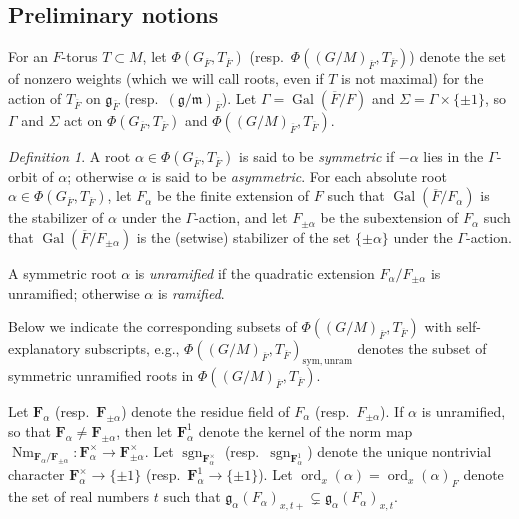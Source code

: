 \documentclass[reqno]{amsart}
\numberwithin{equation}{subsection}
\newcommand{\F}{\mathbf{F}}
\newcommand{\sgn}{\operatorname{sgn}}
\newcommand{\Gal}{\operatorname{Gal}}
\newcommand{\ol}[1]{\overline{#1}}
\newcommand{\co}{\colon}
\DeclareMathOperator{\ord}{ord}
\DeclareMathOperator{\Nm}{Nm}
\theoremstyle{remark}
\newtheorem{defn}[thm]{Definition}
\numberwithin{equation}{subsection}
\numberwithin{figure}{subsection}
\begin{document}
\subsection{Preliminary notions}\label{ssec:FKS-preliminaries}
For an $F$-torus $T \subset M$, let $\Phi(G_{\ol F}, T_{\ol F})$ (resp.\ $\Phi((G/M)_{\ol F}, T_{\ol F})$) denote the set of nonzero weights (which we will call roots, even if $T$ is not maximal) for the action of $T_{\ol F}$ on $\mathfrak{g}_{\ol F}$ (resp.\ $(\mathfrak{g}/\mathfrak{m})_{\ol F}$). Let $\Gamma = \Gal(\ol F/F)$ and $\Sigma = \Gamma \times \{\pm 1\}$, so $\Gamma$ and $\Sigma$ act on $\Phi(G_{\ol F}, T_{\ol F})$ and $\Phi((G/M)_{\ol F}, T_{\ol F})$.

\begin{defn}\label{defn:symmetric-roots}
    A root $\alpha \in \Phi(G_{\ol F}, T_{\ol F})$ is said to be \textit{symmetric} if $-\alpha$ lies in the $\Gamma$-orbit of $\alpha$; otherwise $\alpha$ is said to be \textit{asymmetric}. For each absolute root $\alpha \in \Phi(G_{\ol F}, T_{\ol F})$, let $F_\alpha$ be the finite extension of $F$ such that $\Gal(\ol F/F_\alpha)$ is the stabilizer of $\alpha$ under the $\Gamma$-action, and let $F_{\pm\alpha}$ be the subextension of $F_\alpha$ such that $\Gal(\ol F/F_{\pm\alpha})$ is the (setwise) stabilizer of the set $\{\pm\alpha\}$ under the $\Gamma$-action.
    
    A symmetric root $\alpha$ is \textit{unramified} if the quadratic extension $F_\alpha/F_{\pm\alpha}$ is unramified; otherwise $\alpha$ is \textit{ramified}. 

Below we indicate the corresponding subsets of $\Phi((G/M)_{\ol F}, T_{\ol F})$ with self-explanatory subscripts, e.g., $\Phi((G/M)_{\ol F},T_{\ol F})_{\mathrm{sym,unram}}$ denotes the subset of symmetric unramified roots in $\Phi((G/M)_{\ol F},T_{\ol F})$.
\end{defn}

Let $\F_\alpha$ (resp.\ $\F_{\pm \alpha}$) denote the residue field of $F_\alpha$ (resp.\ $F_{\pm \alpha}$). If $\alpha$ is unramified, so that $\F_\alpha \neq \F_{\pm\alpha}$, then let $\F_\alpha^1$ denote the kernel of the norm map $\Nm_{\F_\alpha/\F_{\pm\alpha}}\co \F_\alpha^\times \to \F_{\pm\alpha}^\times$. Let $\sgn_{\F_\alpha^\times}$ (resp.\ $\sgn_{\F_\alpha^1}$) denote the unique nontrivial character $\F_\alpha^\times \to \{\pm 1\}$ (resp.\ $\F_\alpha^1 \to \{\pm 1\}$). Let $\ord_x(\alpha) = \ord_x(\alpha)_F$ denote the set of real numbers $t$ such that $\mathfrak{g}_\alpha(F_\alpha)_{x, t+} \subsetneq \mathfrak{g}_\alpha(F_\alpha)_{x, t}$.
\end{document}
